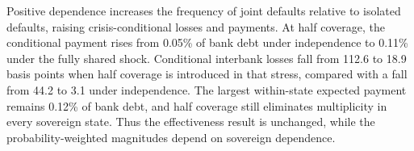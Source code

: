 \begin{table}[htbp]
\centering
{}
\label{tab:sovereign-dependence}
\small


\end{table}

Positive dependence increases the frequency of joint defaults relative to isolated defaults, raising crisis-conditional losses and payments. At half coverage, the conditional payment rises from 0.05\% of bank debt under independence to 0.11\% under the fully shared shock. Conditional interbank losses fall from 112.6 to 18.9 basis points when half coverage is introduced in that stress, compared with a fall from 44.2 to 3.1 under independence. The largest within-state expected payment remains 0.12\% of bank debt, and half coverage still eliminates multiplicity in every sovereign state. Thus the effectiveness result is unchanged, while the probability-weighted magnitudes depend on sovereign dependence.



